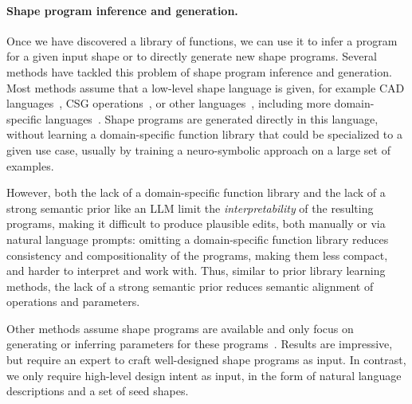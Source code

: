 \paragraph{Shape program inference and generation.}
Once we have discovered a library of functions, we can use it to infer a program for a given input shape or to directly generate new shape programs. Several methods have tackled this problem of shape program inference and generation. Most methods assume that a low-level shape language is given, for example CAD languages~\cite{Fusion360Gallery, wu2021deepcad, xu2022skexgen, li2024sfmcad, xu2021inferring, li2023secad, ren2022extrudenet, uy2022point2cyl}, CSG operations~\cite{kania2020ucsg, ren2021csg, yu2023d, yu2022capri, du2018inversecsg}, or other languages~\cite{jones2020shapeAssembly, jones2024VPIEdit, ganeshan2023improving, tian2019learning, progrip2022}, including more domain-specific languages~\cite{plocharski2024faccaid, guo2020inverse, lee2023latent}. Shape programs are generated directly in this language, without learning a domain-specific function library that could be specialized to a given use case, usually by training a neuro-symbolic approach on a large set of examples.

However, both the lack of a domain-specific function library and the lack of a strong semantic prior like an LLM limit the \emph{interpretability} of the resulting programs, making it difficult to produce plausible edits, both manually or via natural language prompts: omitting a domain-specific function library reduces consistency and compositionality of the programs, making them less compact, and harder to interpret and work with. Thus, similar to prior library learning methods, the lack of a strong semantic prior reduces semantic alignment of operations and parameters.

Other methods assume shape programs are available and only focus on generating or inferring parameters for these programs~\cite{pearl2022geocode, infinigen2023infinite, infinigen2024indoors, MB:2021:DAGA}. Results are impressive, but require an expert to craft well-designed shape programs as input. In contrast, we only require high-level design intent as input, in the form of natural language descriptions and a set of seed shapes.


